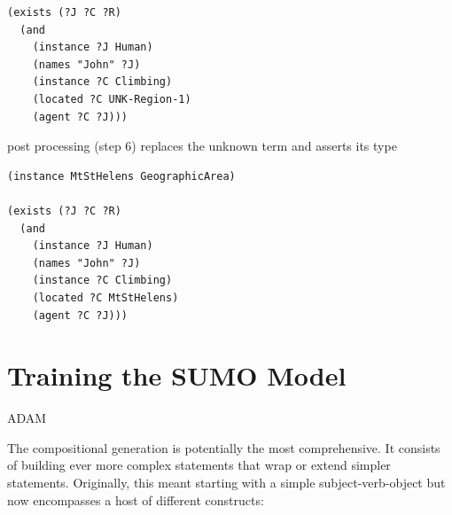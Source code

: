 \documentclass[runningheads]{llncs}
\begin{document}
\begin{verbatim}
(exists (?J ?C ?R)
  (and
    (instance ?J Human)
    (names "John" ?J)
    (instance ?C Climbing)
    (located ?C UNK-Region-1)
    (agent ?C ?J)))
\end{verbatim}

post processing (step 6) replaces the unknown term and asserts its type

\begin{verbatim}
(instance MtStHelens GeographicArea)

(exists (?J ?C ?R)
  (and
    (instance ?J Human)
    (names "John" ?J)
    (instance ?C Climbing)
    (located ?C MtStHelens)
    (agent ?C ?J)))
\end{verbatim}

\section{Training the SUMO Model}
\label{Training}

ADAM

The compositional generation is potentially the most comprehensive. It consists of building ever more complex statements that wrap or extend simpler statements. Originally, this meant starting with a simple subject-verb-object but now encompasses a host of different constructs:
\end{document}
